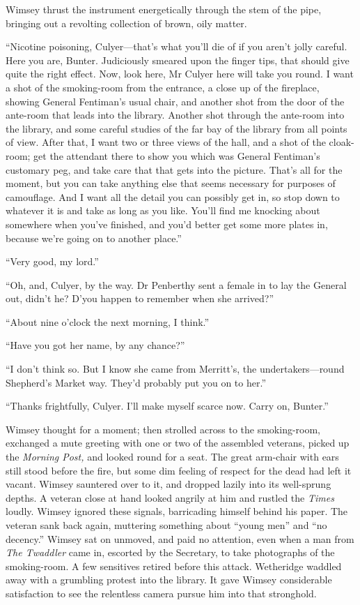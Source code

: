 Wimsey thrust the instrument energetically through the stem of the pipe, bringing out a revolting collection of brown, oily matter.

\enquote{Nicotine poisoning, Culyer\allowbreak---\allowbreak that's what you'll die of if you aren't jolly careful. Here you are, Bunter. Judiciously smeared upon the finger tips, that should give quite the right effect. Now, look here, Mr Culyer here will take you round. I want a shot of the smoking-room from the entrance, a close up of the fireplace, showing General Fentiman's usual chair, and another shot from the door of the ante-room that leads into the library. Another shot through the ante-room into the library, and some careful studies of the far bay of the library from all points of view. After that, I want two or three views of the hall, and a shot of the cloak-room; get the attendant there to show you which was General Fentiman's customary peg, and take care that that gets into the picture. That's all for the moment, but you can take anything else that seems necessary for purposes of camouflage. And I want all the detail you can possibly get in, so stop down to whatever it is and take as long as you like. You'll find me knocking about somewhere when you've finished, and you'd better get some more plates in, because we're going on to another place.}

\enquote{Very good, my lord.}

\enquote{Oh, and, Culyer, by the way. Dr Penberthy sent a female in to lay the General out, didn't he? D'you happen to remember when she arrived?}

\enquote{About nine o'clock the next morning, I think.}

\enquote{Have you got her name, by any chance?}

\enquote{I don't think so. But I know she came from Merritt's, the undertakers\allowbreak---\allowbreak round Shepherd's Market way. They'd probably put you on to her.}

\enquote{Thanks frightfully, Culyer. I'll make myself scarce now. Carry on, Bunter.}

Wimsey thought for a moment; then strolled across to the smoking-room, exchanged a mute greeting with one or two of the assembled veterans, picked up the \textit{Morning Post,} and looked round for a seat. The great arm-chair with ears still stood before the fire, but some dim feeling of respect for the dead had left it vacant. Wimsey sauntered over to it, and dropped lazily into its well-sprung depths. A veteran close at hand looked angrily at him and rustled the \textit{Times} loudly. Wimsey ignored these signals, barricading himself behind his paper. The veteran sank back again, muttering something about \enquote{young men} and \enquote{no decency.} Wimsey sat on unmoved, and paid no attention, even when a man from \textit{The Twaddler} came in, escorted by the Secretary, to take photographs of the smoking-room. A few sensitives retired before this attack. Wetheridge waddled away with a grumbling protest into the library. It gave Wimsey considerable satisfaction to see the relentless camera pursue him into that stronghold.

